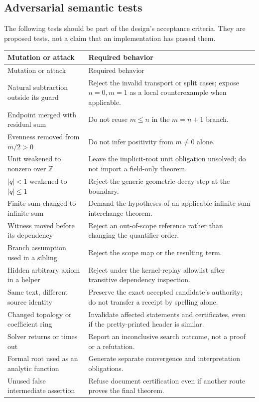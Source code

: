 \documentclass[11pt,letterpaper]{article}
\theoremstyle{definition}
\theoremstyle{remark}
\newcommand{\Z}{\mathbb Z}
\newcommand{\code}[1]{\texttt{\detokenize{#1}}}
\begin{document}
\subsection{Adversarial semantic tests}
The following tests should be part of the design's acceptance criteria. They are proposed tests, not a claim that an implementation has passed them.
\begin{longtable}{@{}p{}p{}@{}}
\toprule
Mutation or attack & Required behavior\\
\midrule
\endfirsthead
\toprule
Mutation or attack & Required behavior\\
\midrule
\endhead
Natural subtraction outside its guard & Reject the invalid transport or split cases; expose $n=0,m=1$ as a local counterexample when applicable.\\[4pt]
Endpoint merged with residual sum & Do not reuse $m\le n$ in the $m=n+1$ branch.\\[4pt]
Evenness removed from $m/2>0$ & Do not infer positivity from $m\ne0$ alone.\\[4pt]
Unit weakened to nonzero over $\Z$ & Leave the implicit-root unit obligation unsolved; do not import a field-only theorem.\\[4pt]
$|q|<1$ weakened to $|q|\le1$ & Reject the generic geometric-decay step at the boundary.\\[4pt]
Finite sum changed to infinite sum & Demand the hypotheses of an applicable infinite-sum interchange theorem.\\[4pt]
Witness moved before its dependency & Reject an out-of-scope reference rather than changing the quantifier order.\\[4pt]
Branch assumption used in a sibling & Reject the scope map or the resulting term.\\[4pt]
Hidden arbitrary axiom in a helper & Reject under the kernel-replay allowlist after transitive dependency inspection.\\[4pt]
Same text, different source identity & Preserve the exact accepted candidate's authority; do not transfer a receipt by spelling alone.\\[4pt]
Changed topology or coefficient ring & Invalidate affected statements and certificates, even if the pretty-printed header is similar.\\[4pt]
Solver returns \code{unknown} or times out & Report an inconclusive search outcome, not a proof or a refutation.\\[4pt]
Formal root used as an analytic function & Generate separate convergence and interpretation obligations.\\[4pt]
Unused false intermediate assertion & Refuse document certification even if another route proves the final theorem.\\
\bottomrule
\end{longtable}
\end{document}
